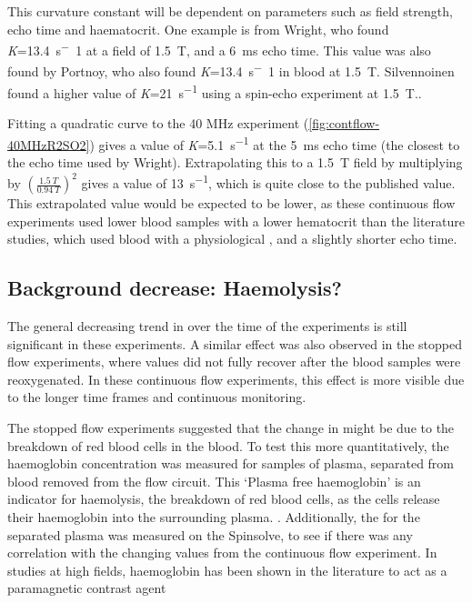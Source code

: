 This curvature constant will be dependent on parameters such as field strength, echo time and haematocrit.
One example is from Wright, who found \textit{K}=\SI{13.4}{s^-1} at a field of \SI{1.5}{T}, and a \SI{6}{ms} echo time\cite{WrightEstimatingoxygensaturation1991}.
This value was also found by Portnoy, who also found \textit{K}=\SI{13.4}{s^-1} in blood at \SI{1.5}{T}\cite{PortnoyRelaxationpropertieshuman2017}.
Silvennoinen found a higher value of \textit{K}=\SI{21}{s^{-1}} using a spin-echo experiment at \SI{1.5}{T}.\cite{SilvennoinenComparisondependenceblood2003}.

Fitting a quadratic curve to the 40 MHz experiment (\autoref{fig:contflow-40MHzR2SO2}) gives a value of \textit{K}=\SI{5.1}{s^{-1}} at the \SI{5}{ms} echo time (the closest to the echo time used by Wright).
Extrapolating this to a \SI{1.5}{T} field by multiplying by $(\frac{\SI{1.5}{T}}{\SI{0.94}{T}})^2$ gives a value of \SI{13}{s^{-1}}, which is quite close to the published value.
This extrapolated value would be expected to be lower, as these continuous flow experiments used lower blood samples with a lower hematocrit than the literature studies, which used blood with a physiological \Hct, and a slightly shorter echo time.

\subsection{Background \Ttwo decrease: Haemolysis?}
\label{sec:contflow-hemolysis}
The general decreasing trend in \Ttwo over the time of the experiments is still significant in these experiments.
A similar effect was also observed in the stopped flow experiments, where \Ttwo values did not fully recover after the blood samples were reoxygenated.
In these continuous flow experiments, this effect is more visible due to the longer time frames and continuous monitoring.

The stopped flow experiments suggested that the change in \Ttwo might be due to the breakdown of red blood cells in the blood.
To test this more quantitatively, the haemoglobin concentration was measured for samples of plasma, separated from blood removed from the flow circuit.
This `Plasma free haemoglobin' is an indicator for haemolysis, the breakdown of red blood cells, as the cells release their haemoglobin into the surrounding plasma. \cite{MalinauskasPlasmaHemoglobinMeasurement1997}.
Additionally, the \Ttwo for the separated plasma was measured on the Spinsolve, to see if there was any correlation with the changing \Ttwo values from the continuous flow experiment.
In studies at high fields, haemoglobin has been shown in the literature to act as a paramagnetic contrast agent \cite{GrgacTransversewaterrelaxation2017}

